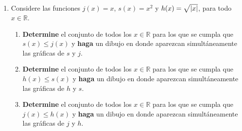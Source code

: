 \documentclass[12pt]{article}
\begin{document}
\begin{enumerate}
\begin{proof}
        Ahora, notemos que para $\varepsilon=1>0$ y para todo $\delta>0$ existe $x_\delta=\min\left\{5/2,2+\delta/2 \right\}>2$ tal que
        \begin{equation*}
            0<\abs{x_\delta-2}=x_\delta-2\leq2+\frac{\delta}{2}-2=\frac{\delta}{2}<\delta
        \end{equation*}
        tal que
        \begin{equation*}
            \abs{x^2-3x-1}\geq\varepsilon=1
        \end{equation*}
        luego, por la definición de límite debe suceder que
        \begin{equation*}
            \lim_{ x\rightarrow 2}x^2+3x\neq1
        \end{equation*}
    \end{proof}

    \item Considere las funciones $j(x)=x$, $s(x)=x^2$ y $h(x)=\sqrt{\left| x \right|}$, para todo $x\in\mathbb{R}$.
    \begin{enumerate}
        \item \textbf{Determine} el conjunto de todos los $x\in\mathbb{R}$ para los que se cumpla que $s(x)\leq j(x)$ y \textbf{haga} un dibujo en donde aparezcan simultáneamente las gráficas de $s$ y $j$.
        \item \textbf{Determine} el conjunto de todos los $x\in\mathbb{R}$ para los que se cumpla que $h(x)\leq s(x)$ y \textbf{haga} un dibujo en donde aparezcan simultáneamente las gráficas de $h$ y $s$.
        \item \textbf{Determine} el conjunto de todos los $x\in\mathbb{R}$ para los que se cumpla que $j(x)\leq h(x)$ y \textbf{haga} un dibujo en donde aparezcan simultáneamente las gráficas de $j$ y $h$.
    \end{enumerate}


\end{enumerate}
\end{document}
